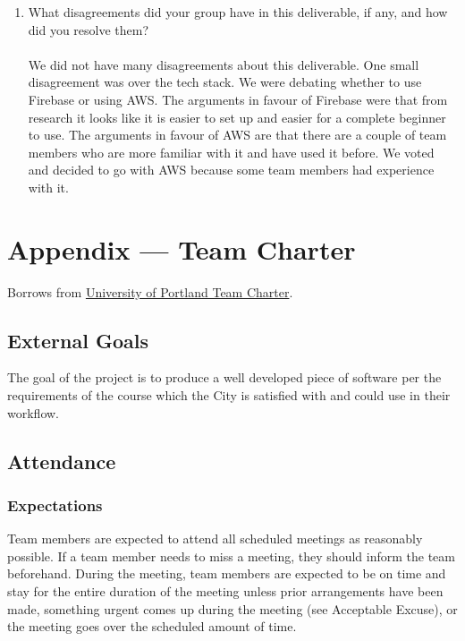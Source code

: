 \documentclass{article}
\begin{document}
\begin{enumerate}
  \item What disagreements did your group have in this deliverable, if any,
    and how did you resolve them?\\
    \\
    We did not have many disagreements about this deliverable. One small disagreement was over the tech
stack. We were debating whether to use Firebase or using AWS. The arguments in favour of Firebase
were that from research it looks like it is easier to set up and easier for a complete beginner to use. The
arguments in favour of AWS are that there are a couple of team members who are more familiar with it
and have used it before. We voted and decided to go with AWS because some team members had
experience with it.
\end{enumerate}

\newpage{}

\section*{Appendix --- Team Charter}

Borrows from
  \href{https://engineering.up.edu/industry_partnerships/files/team-charter.pdf}
{University of Portland Team Charter}.

\subsection*{External Goals}

The goal of the project is to produce a well developed piece of software per the requirements of the course
 which the City is satisfied with and could use in their workflow.

\subsection*{Attendance}

\subsubsection*{Expectations}

Team members are expected to attend all scheduled meetings as reasonably possible. If a team member
needs to miss a meeting, they should inform the team beforehand. During the meeting, team members are
expected to be on time and stay for the entire duration of the meeting unless prior arrangements have been
made, something urgent comes up during the meeting (see Acceptable Excuse), or the meeting goes over the
scheduled amount of time.
\end{document}
